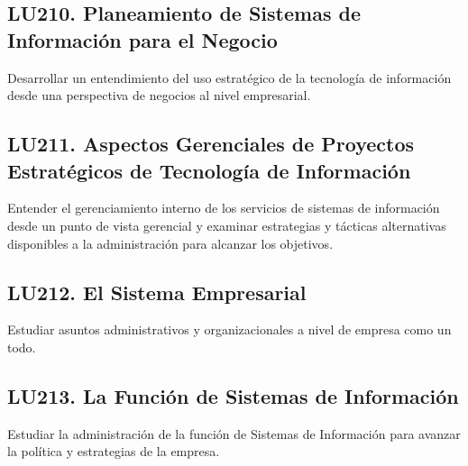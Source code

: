 \subsection{LU210. Planeamiento de Sistemas de Información para el Negocio}\label{sec:LU210}
\begin{LearningUnit}
\begin{LUGoal}
\item Desarrollar un entendimiento del uso estratégico de la tecnología de información desde una perspectiva de negocios al nivel empresarial.
\end{LUGoal}

\end{LearningUnit}

\subsection{LU211. Aspectos Gerenciales de Proyectos Estratégicos de Tecnología de Información}\label{sec:LU211}
\begin{LearningUnit}
\begin{LUGoal}
\item Entender el gerenciamiento interno de los servicios de sistemas de información desde un punto de vista gerencial y examinar estrategias y tácticas alternativas disponibles a la administración para alcanzar los objetivos.
\end{LUGoal}

\end{LearningUnit}

\subsection{LU212. El Sistema Empresarial}\label{sec:LU212}
\begin{LearningUnit}
\begin{LUGoal}
\item Estudiar asuntos administrativos y organizacionales a nivel de empresa como un todo.
\end{LUGoal}

\end{LearningUnit}

\subsection{LU213. La Función de Sistemas de Información}\label{sec:LU213}
\begin{LearningUnit}
\begin{LUGoal}
\item Estudiar la administración de la función de Sistemas de Información para avanzar la política y estrategias de la empresa.
\end{LUGoal}

\end{LearningUnit}

